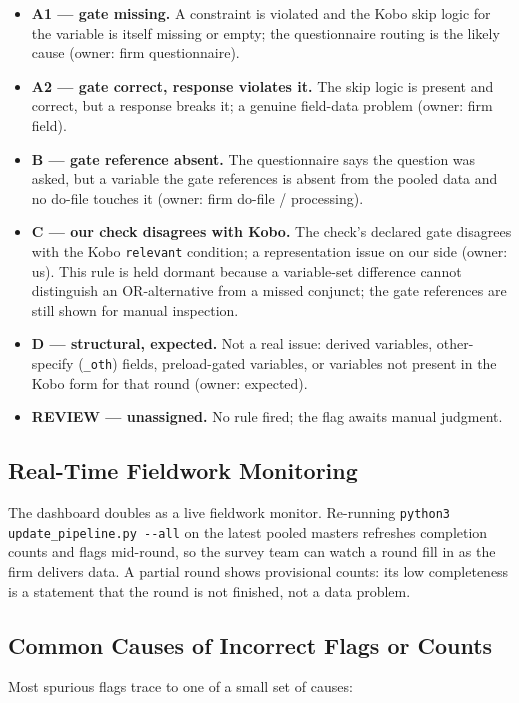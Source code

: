 \begin{itemize}
  \item \textbf{A1 --- gate missing.} A constraint is violated and the Kobo skip logic for the variable is itself missing or empty; the questionnaire routing is the likely cause (owner: firm questionnaire).
  \item \textbf{A2 --- gate correct, response violates it.} The skip logic is present and correct, but a response breaks it; a genuine field-data problem (owner: firm field).
  \item \textbf{B --- gate reference absent.} The questionnaire says the question was asked, but a variable the gate references is absent from the pooled data and no do-file touches it (owner: firm do-file / processing).
  \item \textbf{C --- our check disagrees with Kobo.} The check's declared gate disagrees with the Kobo \texttt{relevant} condition; a representation issue on our side (owner: us). This rule is held dormant because a variable-set difference cannot distinguish an OR-alternative from a missed conjunct; the gate references are still shown for manual inspection.
  \item \textbf{D --- structural, expected.} Not a real issue: derived variables, other-specify (\texttt{\_oth}) fields, preload-gated variables, or variables not present in the Kobo form for that round (owner: expected).
  \item \textbf{REVIEW --- unassigned.} No rule fired; the flag awaits manual judgment.
\end{itemize}

\subsection{Real-Time Fieldwork Monitoring}

The dashboard doubles as a live fieldwork monitor. Re-running \texttt{python3 update\_pipeline.py -{}-all} on the latest pooled masters refreshes completion counts and flags mid-round, so the survey team can watch a round fill in as the firm delivers data. A partial round shows provisional counts: its low completeness is a statement that the round is not finished, not a data problem.

\subsection{Common Causes of Incorrect Flags or Counts}

Most spurious flags trace to one of a small set of causes:

